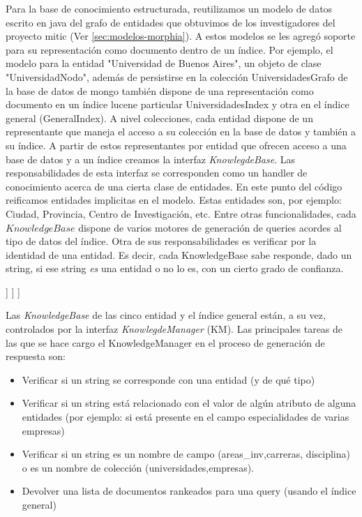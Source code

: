 Para la base de conocimiento estructurada, reutilizamos un modelo de datos
escrito en java  del grafo de entidades que obtuvimos de los investigadores del proyecto mitic (Ver \ref{sec:modelos-morphia}).
A estos modelos se les agregó soporte para su representación como documento dentro de un índice.
Por ejemplo, el modelo para la entidad "Universidad de Buenos Aires", un objeto de clase "UniversidadNodo", además de
persistirse en la colección UniversidadesGrafo de la base de datos de mongo también dispone de una representación como documento en 
un índice lucene particular UniversidadesIndex y otra en el índice general (GeneralIndex).
A nivel colecciones, cada entidad dispone de un representante que maneja el acceso a su colección en la base de datos y también a su índice. A partir de estos representantes por entidad que ofrecen acceso a una base de datos y a un índice creamos la interfaz \emph{KnowlegdeBase}. Las responsabilidades de esta interfaz se corresponden como un handler de conocimiento acerca de una cierta clase de entidades. 
En este punto del código reificamos entidades implicitas en el modelo. Estas entidades son, por ejemplo: Ciudad, Provincia, Centro de Investigación, etc.
Entre otras funcionalidades, cada $KnowledgeBase$ dispone de varios motores de generación de queries acordes al tipo de datos del índice.
Otra de sus responsabilidades es verificar por la identidad de una entidad. Es decir, cada KnowledgeBase sabe responde, dado un string, si ese string \textit{es} una entidad o no lo es, con un cierto grado de confianza. 

\bigskip
[[Reificacion de entidades como algo]]
\bigskip
[[Tablita con totales por entidad]]
\bigskip
[[Relaciones solo presentes en mongo]]
\bigskip

Las \emph{KnowledgeBase} de las cinco entidad y el índice general están, a su vez, controlados por la interfaz \emph{KnowlegdeManager} (KM). 
Las principales tareas de las que se hace cargo el KnowledgeManager en el proceso de generación de respuesta son:

\begin{itemize}
\item Verificar si un string se corresponde con una entidad (y de qu\'e tipo)
\item Verificar si un string est\'a relacionado con el valor de alg\'un atributo de alguna
entidades (por ejemplo: si est\'a presente en el campo especialidades de varias empresas)
\item Verificar si un string es un nombre de campo (areas\_inv,carreras, disciplina) o es un nombre de colecci\'on (universidades,empresas).
\item Devolver una lista de documentos rankeados para una query (usando el índice general)
\end{itemize}

